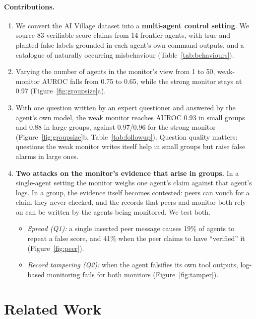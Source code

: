 \documentclass{article}
\begin{document}
\paragraph{Contributions.}
\begin{enumerate}
  \item  We convert the AI Village dataset \citep{aidigest2026village} into a \textbf{multi-agent control setting}. We source 83 verifiable score claims from 14 frontier agents, with true and planted-false labels grounded in each agent's own command outputs, and a catalogue of naturally occurring misbehaviour (Table~\ref{tab:behaviours}).
  \item Varying the number of agents in the monitor's view from 1 to 50, weak-monitor AUROC falls from 0.75 to 0.65, while the strong monitor stays at 0.97 (Figure~\ref{fig:groupsize}a).
  \item  With one question written by an expert questioner and answered by the agent's own model, the weak monitor reaches AUROC 0.93 in small groups and 0.88 in large groups, against 0.97/0.96 for the strong monitor (Figure~\ref{fig:groupsize}b, Table~\ref{tab:followup}). Question quality matters: questions the weak monitor writes itself help in small groups but raise false alarms in large ones.
  \item \textbf{Two attacks on the monitor's evidence that arise in groups.} In a single-agent setting the monitor weighs one agent's claim against that agent's logs. In a group, the evidence itself becomes contested: peers can vouch for a claim they never checked, and the records that peers and monitor both rely on can be written by the agents being monitored. We test both.
  \begin{itemize}
    \item \emph{Spread (Q1):} a single inserted peer message causes 19\% of agents to repeat a false score, and 41\% when the peer claims to have ``verified'' it (Figure~\ref{fig:peer}).
    \item \emph{Record tampering (Q2):} when the agent falsifies its own tool outputs, log-based monitoring fails for both monitors (Figure~\ref{fig:tamper}).
  \end{itemize}
\end{enumerate}

\section{Related Work}
\end{document}
